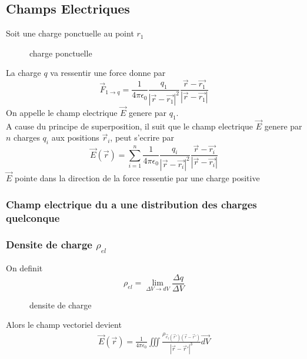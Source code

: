\documentclass[../main.tex]{subfiles}
\begin{document}
\subsection{Champs Electriques}
Soit une charge ponctuelle au point $r_1$ 
\begin{figure}[H]
    \centering
    \caption{charge ponctuelle}
    \label{fig:charge-ponctuelle}
\end{figure}
La charge $q$ va ressentir une force donne par
\[ 
\vec{F}_{1\to q} = \frac{1}{4 \pi \epsilon_0} \frac{q_1}{| \vec{r}-\vec{r_1}|^{2}} \frac{\vec{r}-\vec{r_1}}{| \vec{r}- \vec{r_1}|}
\]
On appelle le champ electrique $\vec{E}$ genere par $q_1$.\\
A cause du principe de superposition, il suit que le champ electrique $\vec{E}$ genere par $n$ charges $q_i$ aux positions $\vec{r}_i$, peut s'ecrire par
\[ 
	\vec{E}( \vec{r}) = \sum_{i=1}^{ n} \frac{1}{4 \pi \epsilon_0} \frac{q_i}{| \vec{r}- \vec{r_i}|^{2}} \frac{\vec{r}- \vec{r_i}}{|\vec{r}-\vec{r_i}|}
\]
$\vec{E}$ pointe dans la direction de la force ressentie par une charge positive
\subsubsection{Champ electrique du a une distribution des charges quelconque}
\subsubsection*{Densite de charge $\rho_{ el }$}
On definit
\[ 
\rho_{el} = \lim_{\Delta V \to dV}  \frac{\Delta q}{\Delta V}
\]
\begin{figure}[H]
    \centering
    \caption{densite de charge}
    \label{fig:densite-de-charge}
\end{figure}
Alors le champ vectoriel devient
\begin{align*}
	\vec{E}( \vec{r}) = \frac{1}{4 \pi \epsilon_0} \iiint \frac{\rho_{\vec{e}_l( \vec{r}') ( \vec{r}-\vec{r}') } }{| \vec{r}-\vec{r}'| ^{3}}\vec{dV}
\end{align*}
\end{document}
